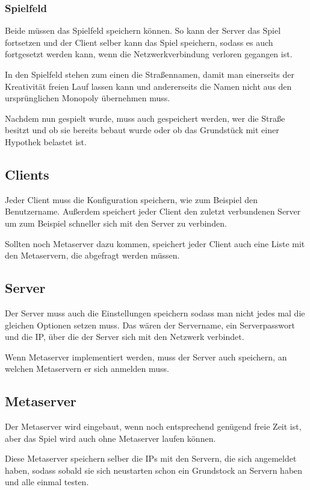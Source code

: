 \documentclass[a4paper,10pt]{article}
\begin{document}
\subsubsection{Spielfeld}
Beide müssen das Spielfeld speichern können. So kann der Server das Spiel fortsetzen und der Client selber kann das Spiel speichern, sodass es auch fortgesetzt werden kann, wenn die Netzwerkverbindung verloren gegangen ist.

In den Spielfeld stehen zum einen die Straßennamen, damit man einerseits der Kreativität freien Lauf lassen kann und andererseits die Namen nicht aus den ursprünglichen Monopoly übernehmen muss.

Nachdem nun gespielt wurde, muss auch gespeichert werden, wer die Straße besitzt und ob sie bereits bebaut wurde oder ob das Grundstück mit einer Hypothek belastet ist.
\subsection{Clients}
Jeder Client muss die Konfiguration speichern, wie zum Beispiel den Benutzername. Außerdem speichert jeder Client den zuletzt verbundenen Server um zum Beispiel schneller sich mit den Server zu verbinden.

Sollten noch Metaserver dazu kommen, speichert jeder Client auch eine Liste mit den Metaservern, die abgefragt werden müssen.
\subsection{Server}
Der Server muss auch die Einstellungen speichern sodass man nicht jedes mal die gleichen Optionen setzen muss. Das wären der Servername, ein Serverpasswort und die IP, über die der Server sich mit den Netzwerk verbindet.

Wenn Metaserver implementiert werden, muss der Server auch speichern, an welchen Metaservern er sich anmelden muss.
\subsection{Metaserver}
Der Metaserver wird eingebaut, wenn noch entsprechend genügend freie Zeit ist, aber das Spiel wird auch ohne Metaserver laufen können.

Diese Metaserver speichern selber die IPs mit den Servern, die sich angemeldet haben, sodass sobald sie sich neustarten schon ein Grundstock an Servern haben und alle einmal testen.
\end{document}
